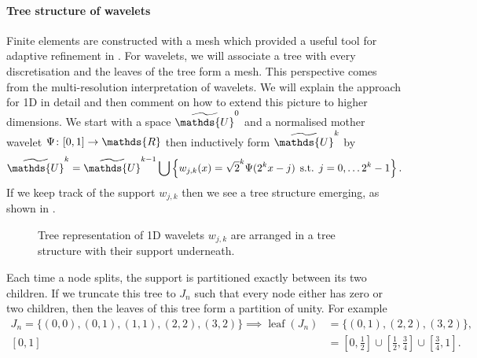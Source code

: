 \documentclass[10pt,a4paper,onecolumn]{article} \usepackage[latin1]{inputenc}
\numberwithin{equation}{section}
\let\F\mathds\let\C\mathcal\newcommand{\R}{\F{R}}\newcommand{\A}{\C{A}}
\newcommand{\op}[1]{\operatorname{#1}}\newcommand{\overtext}[2]{\stackrel{\text{#1}}{#2}}
\DeclareMathOperator{\st}{\;s.t.\;}\DeclareMathOperator{\as}{\;a.s.\;}\renewcommand{\epsilon}{\varepsilon}
\newcommand*{\spcf}[1]{%
	\IfEqCase{#1}{%
		{0}{\F{U}}%
		{1}{\F{V}}%
		{2}{\F{W}}%
	}[\F{U}#1]%
}
\newcommand*{\vard}[1]{%
	\IfEqCase{#1}{%
		{0}{\varphi}%
		{1}{\psi}%
	}[\varphi #1]%
}
\newcommand*{\varx}[1]{%
	\IfEqCase{#1}{%
		{0}{x}%
		{1}{y}%
		{2}{z}%
		{3}{r}%
	}[x#1]%
}
\begin{document}
\paragraph{Tree structure of wavelets}
Finite elements are constructed with a mesh which provided a useful tool for adaptive refinement in . For wavelets, we will associate a tree with every discretisation and the leaves of the tree form a mesh. This perspective comes from the multi-resolution interpretation of wavelets. We will explain the approach for 1D in detail and then comment on how to extend this picture to higher dimensions. We start with a space $\tilde{\spcf0}^0$ and a normalised mother wavelet $\vard1\colon[0,1]\to \R$ then inductively form $\tilde{\spcf0}^k$ by
$$\tilde{\spcf0}^k = \tilde{\spcf0}^{k-1}\bigcup\left\{w_{j,k}(\varx0) = \sqrt{2}^k\vard1(2^{k}\varx0-j)\st j=0,\ldots 2^k-1\right\}.$$
If we keep track of the support $w_{j,k}$ then we see a tree structure emerging, as shown in .
\begin{figure}\begin{center}\end{center}
	\caption{Tree representation of 1D wavelets $w_{j,k}$ are arranged in a tree structure with their support underneath.}\label{fig:ca: wavelet tree}
\end{figure}
Each time a node splits, the support is partitioned exactly between its two children. If we truncate this tree to $J_n$ such that every node either has zero or two children, then the leaves of this tree form a partition of unity. For example
\begin{align*}
	J_n = \{(0,0), (0,1),(1,1), (2,2), (3,2)\} \implies \op{leaf}(J_n) &= \{(0,1), (2,2), (3,2)\}, 
	\\ [0,1] &= [0,\tfrac12]\cup[\tfrac12,\tfrac34]\cup[\tfrac34,1].
\end{align*}
\end{document}
